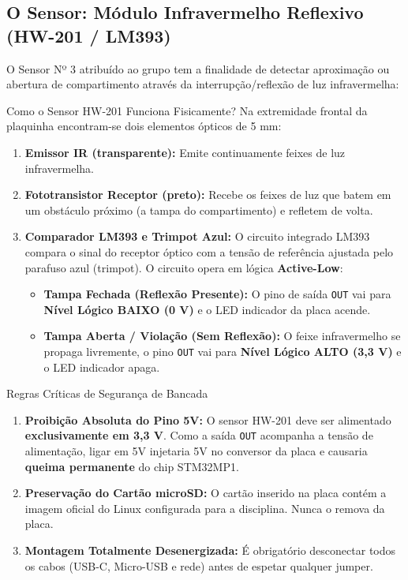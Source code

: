 \documentclass[11pt,a4paper]{article}
\begin{document}
\subsection{O Sensor: Módulo Infravermelho Reflexivo (HW-201 / LM393)}
O Sensor Nº 3 atribuído ao grupo tem a finalidade de detectar aproximação ou abertura de compartimento através da interrupção/reflexão de luz infravermelha:
\begin{theorybox}{Como o Sensor HW-201 Funciona Fisicamente?}
Na extremidade frontal da plaquinha encontram-se dois elementos ópticos de 5 mm:
\begin{enumerate}[leftmargin=*]
    \item \textbf{Emissor IR (transparente):} Emite continuamente feixes de luz infravermelha.
    \item \textbf{Fototransistor Receptor (preto):} Recebe os feixes de luz que batem em um obstáculo próximo (a tampa do compartimento) e refletem de volta.
    \item \textbf{Comparador LM393 e Trimpot Azul:} O circuito integrado LM393 compara o sinal do receptor óptico com a tensão de referência ajustada pelo parafuso azul (trimpot). O circuito opera em lógica \textbf{Active-Low}:
    \begin{itemize}
        \item \textbf{Tampa Fechada (Reflexão Presente):} O pino de saída \texttt{OUT} vai para \textbf{Nível Lógico BAIXO (0 V)} e o LED indicador da placa acende.
        \item \textbf{Tampa Aberta / Violação (Sem Reflexão):} O feixe infravermelho se propaga livremente, o pino \texttt{OUT} vai para \textbf{Nível Lógico ALTO (3,3 V)} e o LED indicador apaga.
    \end{itemize}
\end{enumerate}
\end{theorybox}

\begin{alertbox}{Regras Críticas de Segurança de Bancada}
\begin{enumerate}[leftmargin=*]
    \item \textbf{Proibição Absoluta do Pino 5V:} O sensor HW-201 deve ser alimentado \textbf{exclusivamente em 3,3 V}. Como a saída \texttt{OUT} acompanha a tensão de alimentação, ligar em 5V injetaria 5V no conversor da placa e causaria \textbf{queima permanente} do chip STM32MP1.
    \item \textbf{Preservação do Cartão microSD:} O cartão inserido na placa contém a imagem oficial do Linux configurada para a disciplina. Nunca o remova da placa.
    \item \textbf{Montagem Totalmente Desenergizada:} É obrigatório desconectar todos os cabos (USB-C, Micro-USB e rede) antes de espetar qualquer jumper.
\end{enumerate}
\end{alertbox}
\end{document}
